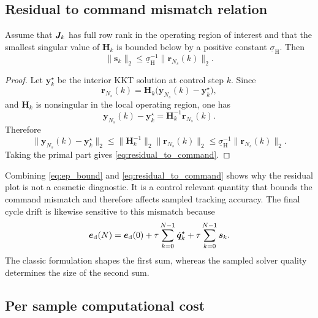 \subsection{Residual to command mismatch relation}

\begin{proposition}
Assume that $\bm{J}_k$ has full row rank in the operating region of interest and that the smallest singular value of $\bm{H}_k$ is bounded below by a positive constant $\underline{\sigma}_{\mathrm{H}}$. Then
\begin{equation}
  \|\bm{s}_k\|_2
  \le
  \underline{\sigma}_{\mathrm{H}}^{-1}
  \|\bm{r}_{N_s}(k)\|_2.
  \label{eq:residual_to_command}
\end{equation}
\end{proposition}

\begin{proof}
Let $\bm{y}_k^\star$ be the interior KKT solution at control step $k$. Since
\begin{equation}
  \bm{r}_{N_s}(k)
  =
  \bm{H}_k\bigl(\bm{y}_{N_s}(k)-\bm{y}_k^\star\bigr),
\end{equation}
and $\bm{H}_k$ is nonsingular in the local operating region, one has
\begin{equation}
  \bm{y}_{N_s}(k)-\bm{y}_k^\star
  =
  \bm{H}_k^{-1}\bm{r}_{N_s}(k).
\end{equation}
Therefore
\begin{equation}
  \|\bm{y}_{N_s}(k)-\bm{y}_k^\star\|_2
  \le
  \|\bm{H}_k^{-1}\|_2 \|\bm{r}_{N_s}(k)\|_2
  \le
  \underline{\sigma}_{\mathrm{H}}^{-1}\|\bm{r}_{N_s}(k)\|_2.
\end{equation}
Taking the primal part gives \eqref{eq:residual_to_command}.
\end{proof}

Combining \eqref{eq:ep_bound} and \eqref{eq:residual_to_command} shows why the residual plot is not a cosmetic diagnostic. It is a control relevant quantity that bounds the command mismatch and therefore affects sampled tracking accuracy. The final cycle drift is likewise sensitive to this mismatch because
\begin{equation}
  \bm{e}_{\mathrm{d}}(N)
  =
  \bm{e}_{\mathrm{d}}(0)
  +
  \tau \sum_{k=0}^{N-1}\dot{\bm{q}}_k^\star
  +
  \tau \sum_{k=0}^{N-1}\bm{s}_k.
\end{equation}
The classic formulation shapes the first sum, whereas the sampled solver quality determines the size of the second sum.

\subsection{Per sample computational cost}

